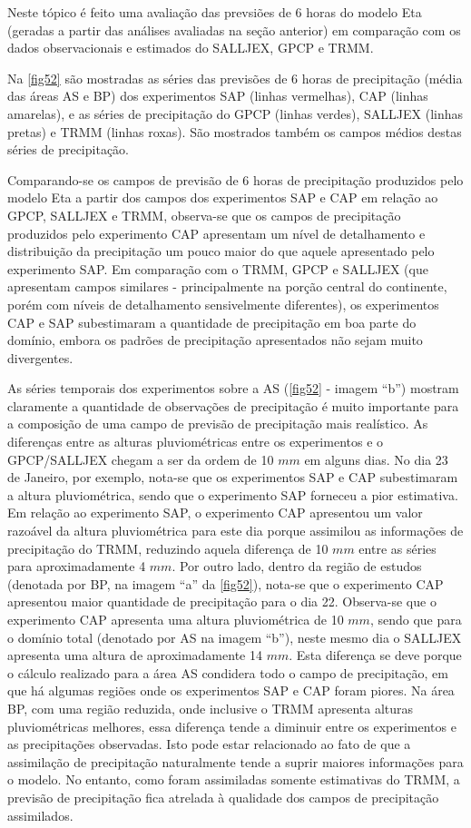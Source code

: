 Neste tópico é feito uma avaliação das prevsiões de 6 horas do modelo Eta (geradas a partir das análises avaliadas na seção anterior) em comparação com os dados observacionais e estimados do SALLJEX, GPCP e TRMM.

Na \autoref{fig52} são mostradas as séries das previsões de 6 horas de precipitação (média das áreas AS e BP) dos experimentos SAP (linhas vermelhas), CAP (linhas amarelas), e as séries de precipitação do GPCP (linhas verdes),  SALLJEX (linhas pretas) e TRMM (linhas roxas). São mostrados também os campos médios destas séries de precipitação.

Comparando-se os campos de previsão de 6 horas de precipitação produzidos pelo modelo Eta a partir dos campos dos experimentos SAP e CAP em relação ao GPCP, SALLJEX e TRMM, observa-se que os campos de precipitação produzidos pelo experimento CAP apresentam um nível de detalhamento e distribuição da precipitação um pouco maior do que aquele apresentado pelo experimento SAP. Em comparação com o TRMM, GPCP e SALLJEX (que apresentam campos similares - principalmente na porção central do continente, porém com níveis de detalhamento sensivelmente diferentes), os experimentos CAP e SAP subestimaram a quantidade de precipitação em boa parte do domínio, embora os padrões de precipitação apresentados não sejam muito divergentes. 

As séries temporais dos experimentos sobre a AS (\autoref{fig52} - imagem ``b'') mostram claramente a quantidade de observações de precipitação é muito importante para a composição de uma campo de previsão de precipitação mais realístico. As diferenças entre as alturas pluviométricas entre os experimentos e o GPCP/SALLJEX chegam a ser da ordem de 10 $mm$ em alguns dias. No dia 23 de Janeiro, por exemplo, nota-se que os experimentos SAP e CAP subestimaram a altura pluviométrica, sendo que o experimento SAP forneceu a pior estimativa.  Em relação ao experimento SAP, o experimento CAP apresentou um valor razoável da altura pluviométrica para este dia porque assimilou as informações de precipitação do TRMM, reduzindo aquela diferença de 10 $mm$ entre as séries para aproximadamente 4 $mm$. Por outro lado, dentro da região de estudos (denotada por BP, na imagem ``a'' da \autoref{fig52}), nota-se que o experimento CAP apresentou maior quantidade de precipitação para o dia 22. Observa-se que o experimento CAP apresenta uma altura pluviométrica de 10 $mm$, sendo que para o domínio total (denotado por AS na imagem ``b''), neste mesmo dia o SALLJEX apresenta uma altura de aproximadamente 14 $mm$. Esta diferença se deve porque o cálculo realizado para a área AS condidera todo o campo de precipitação, em que há algumas regiões onde os experimentos SAP e CAP foram piores. Na área BP, com uma região reduzida, onde inclusive o TRMM apresenta alturas pluviométricas melhores, essa diferença tende a diminuir entre os experimentos e as precipitações observadas. Isto pode estar relacionado ao fato de que a assimilação de precipitação naturalmente tende a suprir maiores informações para o modelo. No entanto, como foram assimiladas somente estimativas do TRMM, a previsão de precipitação fica atrelada à qualidade dos campos de precipitação assimilados. 

